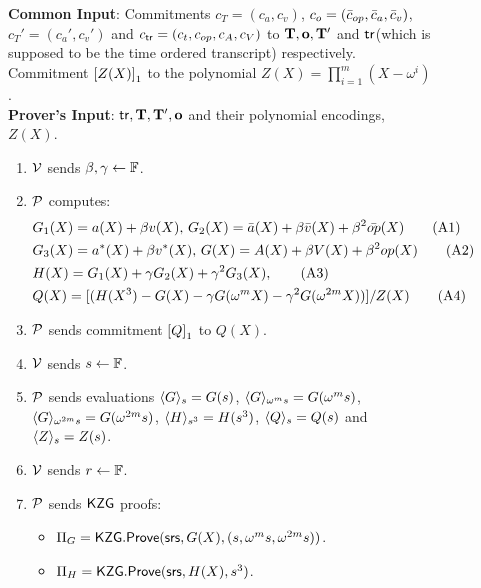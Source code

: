 \begin{figure}[htbp]

    \begin{mdframed}
    {
            {\bf Common Input}: Commitments $c_T=(c_a,c_v)$, $c_o=(\bar{c}_\op, \bar{c}_a, \bar{c}_v)$, $c_T'=(c_a', c_v')$
        and $c_\tr=(c_t, c_\op, c_A, c_V)$ to $\vecT,\vec{o},\vecT'$ and $\tr$(which is supposed to be the time ordered transcript) respectively. Commitment $\gone{Z(X)}$ to the polynomial
        $Z(X)=\prod_{i=1}^m (X-\omega^i)$.\\
    {\bf Prover's Input}: $\tr, \vecT, \vecT', \vec{o}$ and their polynomial encodings, $Z(X)$.
        \begin{enumerate}[leftmargin=1em, label=\arabic*.]
            \item $\verifier$ sends $\beta,\gamma\gets \F$.
            \item $\prover$ computes:
            \begin{align}\label{eq:poly-constraints}
            & G_1(X) = a(X) + \beta v(X),\, G_2(X) = \bar{a}(X) + \beta \bar{v}(X) + \beta^2 \bar{\op}(X) \tag{A1} \\
            & G_3(X) = a^*(X) + \beta v^*(X),\, G(X) = A(X) + \beta V(X) + \beta^2 \op(X) \tag{A2} \\
            & H(X) = G_1(X) + \gamma G_2(X) + \gamma^2 G_3(X), \tag{A3} \\
            & Q(X) = [(H(X^3) - G(X) - \gamma G(\omega^m X) - \gamma^2 G(\omega^{2m} X))]/Z(X) \tag{A4}
            \end{align}
            \item $\prover$ sends commitment $\gone{Q}$ to $Q(X)$.
            \item $\verifier$ sends $s\gets\F$.
            \item $\prover$ sends evaluations $\val{s}{G}=G(s)$, $\val{\omega^m s}{G}=G(\omega^m s)$,
            $\val{\omega^{2m}s}{G}=G(\omega^{2m} s)$, $\val{s^3}{H}=H(s^3)$, $\val{s}{Q}=Q(s)$ and $\val{s}{Z}=Z(s)$.
            \item $\verifier$ sends $r\gets\F$.
            \item $\prover$ sends $\kzg$ proofs:
            \begin{itemize}[leftmargin=1em]
                \item $\Pi_G=\kzgprove(\srs,G(X),(s,\omega^m s, \omega^{2m}s))$.
                \item $\Pi_H=\kzgprove(\srs,H(X),s^3)$.

\end{itemize}
\end{enumerate}}
\end{mdframed}
\end{figure}
